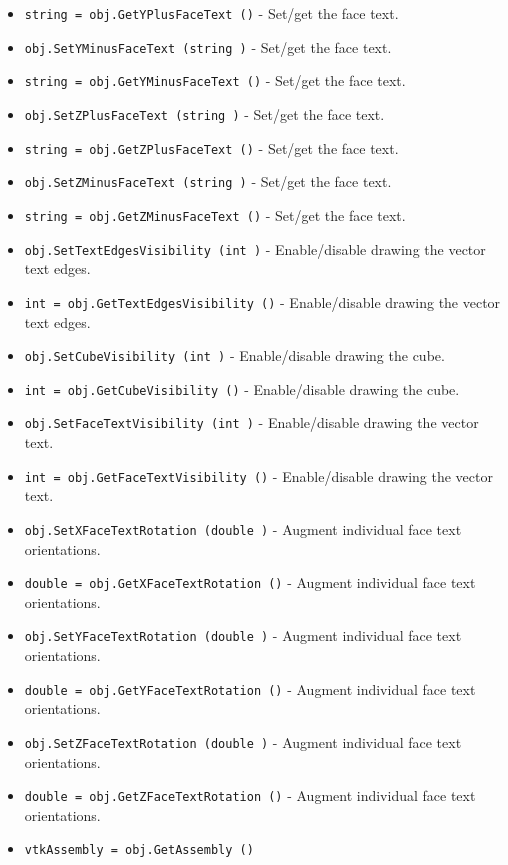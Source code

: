 \begin{itemize}
\item  \verb|string = obj.GetYPlusFaceText ()| -  Set/get the face text.

\item  \verb|obj.SetYMinusFaceText (string )| -  Set/get the face text.

\item  \verb|string = obj.GetYMinusFaceText ()| -  Set/get the face text.

\item  \verb|obj.SetZPlusFaceText (string )| -  Set/get the face text.

\item  \verb|string = obj.GetZPlusFaceText ()| -  Set/get the face text.

\item  \verb|obj.SetZMinusFaceText (string )| -  Set/get the face text.

\item  \verb|string = obj.GetZMinusFaceText ()| -  Set/get the face text.

\item  \verb|obj.SetTextEdgesVisibility (int )| -  Enable/disable drawing the vector text edges.

\item  \verb|int = obj.GetTextEdgesVisibility ()| -  Enable/disable drawing the vector text edges.

\item  \verb|obj.SetCubeVisibility (int )| -  Enable/disable drawing the cube.

\item  \verb|int = obj.GetCubeVisibility ()| -  Enable/disable drawing the cube.

\item  \verb|obj.SetFaceTextVisibility (int )| -  Enable/disable drawing the vector text.

\item  \verb|int = obj.GetFaceTextVisibility ()| -  Enable/disable drawing the vector text.

\item  \verb|obj.SetXFaceTextRotation (double )| -  Augment individual face text orientations.

\item  \verb|double = obj.GetXFaceTextRotation ()| -  Augment individual face text orientations.

\item  \verb|obj.SetYFaceTextRotation (double )| -  Augment individual face text orientations.

\item  \verb|double = obj.GetYFaceTextRotation ()| -  Augment individual face text orientations.

\item  \verb|obj.SetZFaceTextRotation (double )| -  Augment individual face text orientations.

\item  \verb|double = obj.GetZFaceTextRotation ()| -  Augment individual face text orientations.

\item  \verb|vtkAssembly = obj.GetAssembly ()|

\end{itemize}
